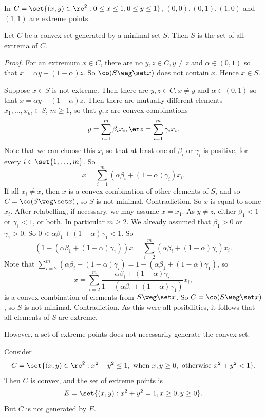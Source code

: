 \documentclass[12pt,a4paper]{article}
\begin{document}
\begin{example}
    In $C=\set{(x,y)\in\re^2:0\le x\le 1, 0\le y \le 1}$, $(0,0),(0,1), (1,0)$ and $(1,1)$ are extreme points. 
\end{example}


\begin{lemma}\label{lem:theminimalsetisthesetofextrema}
		Let $C$ be a convex set generated by a minimal set $S$.  Then $S$ is the set of all extrema of $C$. 
	\end{lemma}
	\begin{proof}
For an extremum $x\in C$, there are no $y,z\in C,y\neq z$ and $\alpha\in(0,1)$ so that $x=\alpha y +(1-\alpha)z$. So $\co(S\weg \set x)$ does not contain $x$. Hence $x\in S$. 
	
Suppose $x\in S$ is not extreme. Then there are $y,z\in C,x\neq y$ and $\alpha\in(0,1)$ so that $x=\alpha y+(1-\alpha)z$. Then there are mutually different elements $x_1,\ldots,x_m\in S$, $m\ge 1$, so that $y,z$ are convex combinations 
\[
y=\sum_{i=1}^m \beta_ix_i,\en z=\sum_{i=1}^m \gamma_ix_i. 
\]	
Note that we can choose this $x_i$ so that at least one of $\beta_i$ or $\gamma_i$ is positive, for every $i\in\set{1,\ldots,m}$. 
So \[
x= \sum_{i=1}^m (\alpha\beta_i+(1-\alpha)\gamma_i)x_i. 
\]
If all $x_i\neq x$, then $x$ is a convex combination of other elements of $S$, and so $C=\co(S\weg\set x)$, so $S$ is not minimal. Contradiction. So $x$ is equal to some $x_i$. 
After relabelling, if necessary, we may assume $x=x_1$. As $y\neq z$, either $\beta_1<1$ or $\gamma_1<1$, or both. In particular $m\ge 2$. We already assumed that $\beta_1>0$ or $\gamma_1>0$. So $0<\alpha\beta_1+(1-\alpha)\gamma_1<1$. So 
\[
(1-(\alpha\beta_1+(1-\alpha)\gamma_1))x =  \sum_{i=2}^m (\alpha\beta_i+(1-\alpha)\gamma_i)x_i.
\]
Note that $\sum_{i=2}^m (\alpha\beta_i+(1-\alpha)\gamma_i)=1- (\alpha\beta_1+(1-\alpha)\gamma_1)$, so 
\[
x =  \sum_{i=2}^m \frac{\alpha\beta_i+(1-\alpha)\gamma_i}{1-(\alpha\beta_1+(1-\alpha)\gamma_1)}x_i,
\]
is a convex combination of elements from $S\weg \set x$. So $C=\co(S\weg\set x)$, so $S$ is not minimal. Contradiction. As this were all posibilities, it follows that all elements of $S$ are extreme. 
\end{proof}

However, a set of extreme points does not necessarily generate the convex set. 

\begin{example} Consider \[
	C = \set{(x,y)\in \re ^ 2: x^2+y^2\le 1, \text{ when }x,y\ge 0, \text{ otherwise }x^2+y^2<1}. 
	\]
	Then $C$ is convex, and the set of extreme points is 
	\[
	E = \set{(x,y):x^2+y^2=1, x\ge 0, y\ge 0}. 
	\]
	But $C$ is not generated by $E$. 
\end{example}
\end{document}
